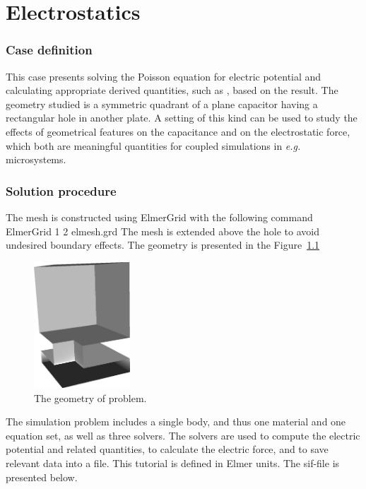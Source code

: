 \chapter{Electrostatics}


\subsection*{Case definition}

This case presents solving the Poisson equation for electric potential
and calculating appropriate derived quantities, such as
, based on the result. The geometry studied is a
symmetric quadrant of a plane capacitor having a rectangular hole in
another plate. A setting of this kind can be used to study the effects
of geometrical features on the capacitance and on the electrostatic
force, which both are meaningful quantities for coupled
simulations in {\em e.g.}  microsystems.


\subsection*{Solution procedure}

The mesh is constructed using ElmerGrid with the following command
\ttbegin
ElmerGrid 1 2 elmesh.grd
\ttend
The mesh is extended above the hole to avoid undesired boundary
effects. The geometry is presented in the Figure~\ref{geo_elstat}

\begin{figure}[hbt]
  \centerline{\includegraphics[width=0.32\textwidth]{geo_elstat}}
  \caption{The geometry of problem.} 
  \label{geo_elstat}
\end{figure}

The simulation problem includes a single body, and thus one material
and one equation set, as well as three solvers. The solvers are used
to compute the electric potential and related quantities, to calculate
the electric force, and to save relevant data into a file. This
tutorial is defined in Elmer  units. The sif-file is presented
below.

